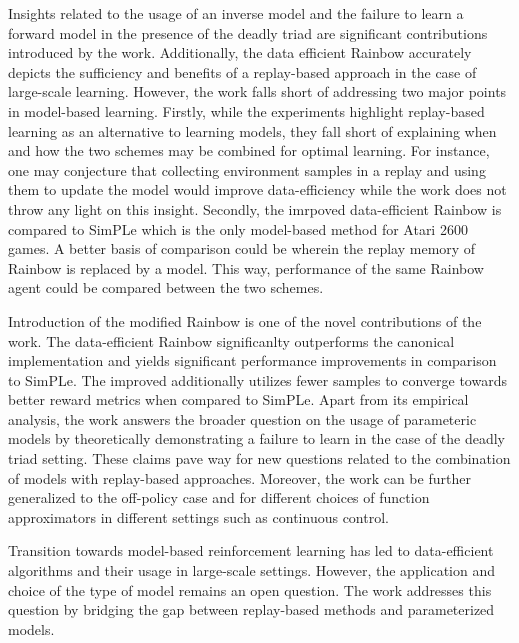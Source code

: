 \documentclass[10pt,letterpaper]{article}
\begin{document}
Insights related to the usage of an inverse model and the failure to learn a forward model in the presence of the deadly triad are significant contributions introduced by the work. Additionally, the data efficient Rainbow accurately depicts the sufficiency and benefits of a replay-based approach in the case of large-scale learning. However, the work falls short of addressing two major points in model-based learning. Firstly, while the experiments highlight replay-based learning as an alternative to learning models, they fall short of explaining when and how the two schemes may be combined for optimal learning. For instance, one may conjecture that collecting environment samples in a replay and using them to update the model would improve data-efficiency while the work does not throw any light on this insight. Secondly, the imrpoved data-efficient Rainbow is compared to SimPLe which is the only model-based method for Atari 2600 games. A better basis of comparison could be wherein the replay memory of Rainbow is replaced by a model. This way, performance of the same Rainbow agent could be compared between the two schemes. 

Introduction of the modified Rainbow is one of the novel contributions of the work. The data-efficient Rainbow significanlty outperforms the canonical implementation and yields significant performance improvements in comparison to SimPLe. The improved additionally utilizes fewer samples to converge towards better reward metrics when compared to SimPLe. Apart from its empirical analysis, the work answers the broader question on the usage of parameteric models by theoretically demonstrating a failure to learn in the case of the deadly triad setting. These claims pave way for new questions related to the combination of models with replay-based approaches. Moreover, the work can be further generalized to the off-policy case and for different choices of function approximators in different settings such as continuous control. 

Transition towards model-based reinforcement learning has led to data-efficient algorithms and their usage in large-scale settings. However, the application and choice of the type of model remains an open question. The work addresses this question by bridging the gap between replay-based methods and parameterized models.  
\end{document}
